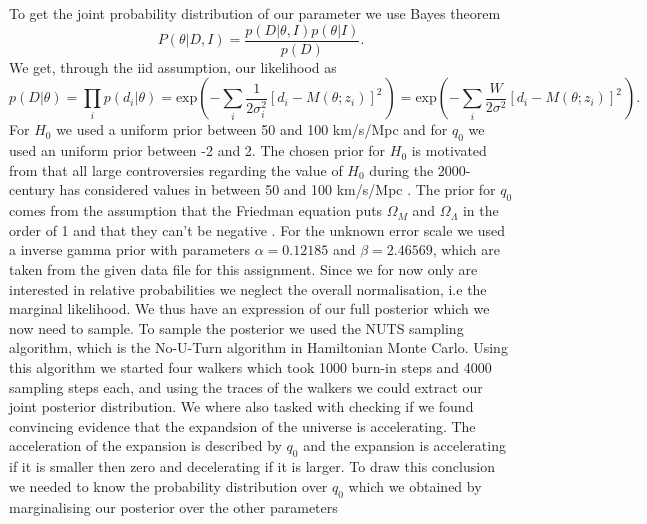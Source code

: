 \documentclass[11pt,a4paper]{article}
\begin{document}
\\\\
To get the joint probability distribution of our parameter we use Bayes theorem 
\begin{equation*}
    P(\theta| D, I) =  \frac{p(D|\theta, I)p(\theta|I)}{p(D)}.
\end{equation*}
We get, through the iid assumption, our likelihood as
\begin{equation*}
    p(D|\theta) =  \prod_i p(d_i|\theta) = \text{exp}\left(-\sum_i \frac{1}{2\sigma_i^2}\left[d_i - M(\theta;z_i)\right]^2\frac{}{}\right) =  \text{exp}\left(-\sum_i \frac{W}{2\sigma^2}\left[d_i - M(\theta;z_i)\right]^2\frac{}{}\right).
\end{equation*}
For $H_0$ we used a uniform prior between 50 and 100 km/s/Mpc and for $q_0$ we used an uniform prior between -2 and 2. The chosen prior for $H_0$ is motivated from that all large controversies regarding the value of $H_0$ during the 2000-century has considered values in between 50 and 100 km/s/Mpc \cite{Hubbles_law}. The prior for $q_0$ comes from the assumption that the Friedman equation puts $\Omega_M$ and $\Omega_\Lambda$ in the order of 1 and that they can't be negative \cite{project_pm}. For the unknown error scale we used a inverse gamma prior with parameters $\alpha = 0.12185$ and $\beta = 2.46569$, which are taken from the given data file for this assignment. Since we for now only are interested in relative probabilities we neglect the overall normalisation, i.e the marginal likelihood. We thus have an expression of our full posterior which we now need to sample. To sample the posterior we used the NUTS sampling algorithm, which is the No-U-Turn algorithm in Hamiltonian Monte Carlo. Using this algorithm we started four walkers which took 1000 burn-in steps and 4000 sampling steps each, and using the traces of the walkers we could extract our joint posterior distribution. We where also tasked with checking if we found convincing evidence that the expandsion of the universe is accelerating. The acceleration of the expansion is described by $q_0$ and the expansion is accelerating if it is smaller then zero and decelerating if it is larger. To draw this conclusion we needed to know the probability distribution over $q_0$ which we obtained by marginalising our posterior over the other parameters
\end{document}
